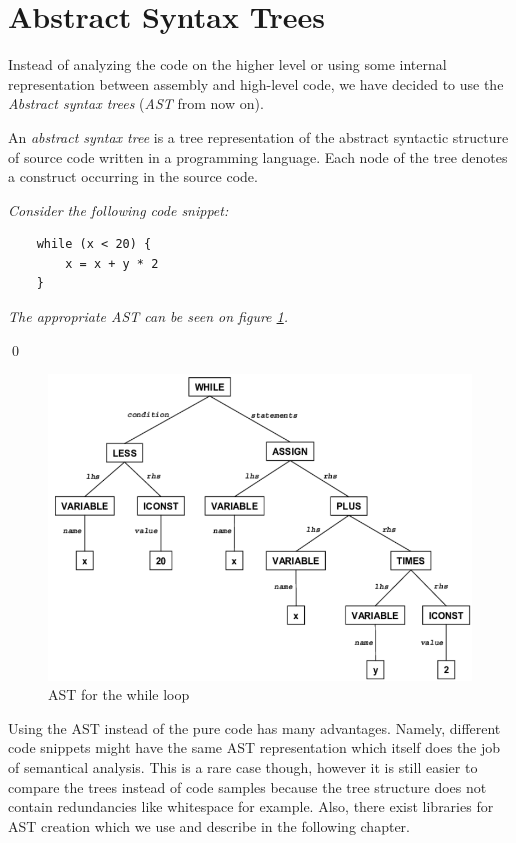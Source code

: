 \section{Abstract Syntax Trees}
\label{sec:AST}

Instead of analyzing the code on the higher level or using some internal representation between assembly and high-level code, we have decided to use the \emph{Abstract syntax trees} (\emph{AST} from now on).

\begin{defn}
    An \emph{abstract syntax tree} is a tree representation of the abstract syntactic structure of source code written in a programming language. Each node of the tree denotes a construct occurring in the source code.
\end{defn}

\begin{exmp}
    \textit{Consider the following code snippet:}

    \begin{lstlisting}
    while (x < 20) {
        x = x + y * 2
    }
    \end{lstlisting}

    \textit{The appropriate AST can be seen on figure \ref{fig:WhileAST}.}

\qed
\end{exmp}

\begin{figure}
    \centering
    \includegraphics[scale=0.6]{res/WhileAST.PNG}
    \caption{AST for the while loop}
    \label{fig:WhileAST}
\end{figure}

Using the AST instead of the pure code has many advantages. Namely, different code snippets might have the same AST representation which itself does the job of semantical analysis. This is a rare case though, however it is still easier to compare the trees instead of code samples because the tree structure does not contain redundancies like whitespace for example. Also, there exist libraries for AST creation which we use and describe in the following chapter.
